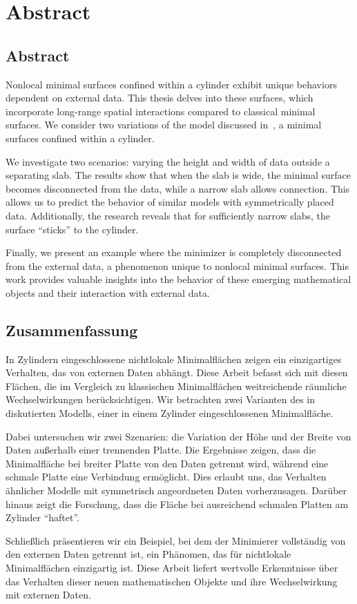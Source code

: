 \chapter{Abstract}
\label{ch:abstract}

\section*{Abstract}
Nonlocal minimal surfaces confined within a cylinder exhibit unique behaviors dependent on
external data. This thesis delves into these surfaces, which incorporate long-range
spatial interactions compared to classical minimal surfaces. We consider two variations of
the model discussed in~\cite{dipierro2020disconnectedness}, a minimal surfaces confined
within a cylinder.\newline

We investigate two scenarios: varying the height and width of data outside a separating
slab. The results show that when the slab is wide, the minimal surface becomes
disconnected from the data, while a narrow slab allows connection. This allows us to
predict the behavior of similar models with symmetrically placed data. Additionally, the
research reveals that for sufficiently narrow slabs, the surface \enquote{sticks} to the
cylinder.\newline 

Finally, we present an example where the minimizer is completely disconnected from the
external data, a phenomenon unique to nonlocal minimal surfaces. This work provides
valuable insights into the behavior of these emerging mathematical objects and their
interaction with external data.


\section*{Zusammenfassung}
In Zylindern eingeschlossene nichtlokale Minimalflächen zeigen ein einzigartiges
Verhalten, das von externen Daten abhängt. Diese Arbeit befasst sich mit diesen Flächen,
die im Vergleich zu klassischen Minimalflächen weitreichende räumliche Wechselwirkungen
berücksichtigen. Wir betrachten zwei Varianten des in~\cite{dipierro2020disconnectedness}
diskutierten Modells, einer in einem Zylinder eingeschlossenen Minimalfläche.\newline

Dabei untersuchen wir zwei Szenarien: die Variation der Höhe und der Breite von Daten
außerhalb einer trennenden Platte. Die Ergebnisse zeigen, dass die Minimalfläche bei
breiter Platte von den Daten getrennt wird, während eine schmale Platte eine Verbindung
ermöglicht. Dies erlaubt uns, das Verhalten ähnlicher Modelle mit symmetrisch angeordneten
Daten vorherzusagen. Darüber hinaus zeigt die Forschung, dass die Fläche bei ausreichend
schmalen Platten am Zylinder \enquote{haftet}.\newline

Schließlich präsentieren wir ein Beispiel, bei dem der Minimierer vollständig von den
externen Daten getrennt ist, ein Phänomen, das für nichtlokale Minimalflächen einzigartig
ist. Diese Arbeit liefert wertvolle Erkenntnisse über das Verhalten dieser neuen
mathematischen Objekte und ihre Wechselwirkung mit externen Daten.